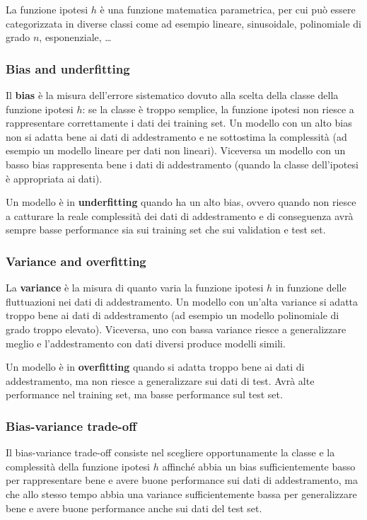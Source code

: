 La funzione ipotesi \(h\) è una funzione matematica parametrica, per cui può essere categorizzata in diverse classi
come ad esempio lineare, sinusoidale, polinomiale di grado \(n\), esponenziale, \dots

\subsubsection*{Bias and underfitting}
Il \textbf{bias} è la misura dell'errore sistematico dovuto alla scelta della classe della funzione ipotesi \(h\): se
la classe è troppo semplice, la funzione ipotesi non riesce a rappresentare correttamente i dati dei training set. Un
modello con un alto bias non si adatta bene ai dati di addestramento e ne sottostima la complessità (ad esempio un modello
lineare per dati non lineari). Viceversa un modello con un basso bias rappresenta bene i dati di addestramento (quando
la classe dell'ipotesi è appropriata ai dati).

Un modello è in \textbf{underfitting} quando ha un alto bias, ovvero quando non riesce a catturare la reale complessità
dei dati di addestramento e di conseguenza avrà sempre basse performance sia sui training set che sui validation e test set.

\subsubsection*{Variance and overfitting}
La \textbf{variance} è la misura di quanto varia la funzione ipotesi \(h\) in funzione delle fluttuazioni nei dati di
addestramento. Un modello con un'alta variance si adatta troppo bene ai dati di addestramento (ad esempio un modello
polinomiale di grado troppo elevato). Viceversa, uno con bassa variance riesce a generalizzare meglio e l'addestramento
con dati diversi produce modelli simili.

Un modello è in \textbf{overfitting} quando si adatta troppo bene ai dati di addestramento, ma non riesce a generalizzare
sui dati di test. Avrà alte performance nel training set, ma basse performance sul test set.

\subsubsection*{Bias-variance trade-off}
Il bias-variance trade-off consiste nel scegliere opportunamente la classe e la complessità della funzione ipotesi \(h\)
affinché abbia un bias sufficientemente basso per rappresentare bene e avere buone performance sui dati di addestramento,
ma che allo stesso tempo abbia una variance sufficientemente bassa per generalizzare bene e avere buone performance anche
sui dati del test set.

